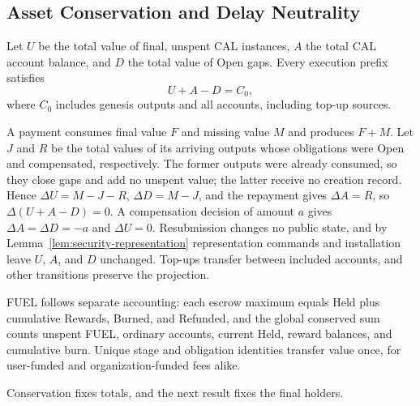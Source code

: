 \subsection{Asset Conservation and Delay Neutrality}
\label{sec:security-conservation}

\begin{theorem}
\label{thm:security-conservation}
Let $U$ be the total value of final, unspent CAL instances, $A$ the total
CAL account balance, and $D$ the total value of Open gaps. Every
execution prefix satisfies
\begin{equation}
 U+A-D=C_0,
 \label{eq:security-conservation}
\end{equation}
where $C_0$ includes genesis outputs and all accounts, including top-up
sources.
\end{theorem}
\begin{IEEEproof}
A payment consumes final value $F$ and missing value $M$ and produces $F+M$. Let $J$ and $R$ be the total values of its arriving outputs whose obligations were Open and compensated, respectively. The former outputs were already consumed, so they close gaps and add no unspent value; the latter receive no creation record. Hence $\Delta U=M-J-R$, $\Delta D=M-J$, and the repayment gives $\Delta A=R$, so $\Delta(U+A-D)=0$. A compensation decision of amount $a$ gives $\Delta A=\Delta D=-a$ and $\Delta U=0$. Resubmission changes no public state, and by Lemma~\ref{lem:security-representation} representation commands and installation leave $U$, $A$, and $D$ unchanged. Top-ups transfer between included accounts, and other transitions preserve the projection.
\end{IEEEproof}

FUEL follows separate accounting: each escrow maximum equals Held plus cumulative Rewards, Burned, and Refunded, and the global conserved sum counts unspent FUEL, ordinary accounts, current Held, reward balances, and cumulative burn. Unique stage and obligation identities transfer value once, for user-funded and organization-funded fees alike.

Conservation fixes totals, and the next result fixes the final holders.

